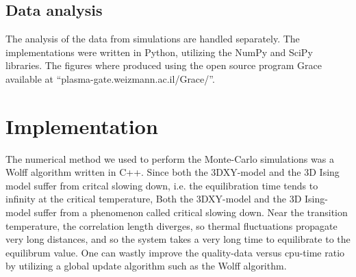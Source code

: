 \subsection{Data analysis}
The analysis of the data from simulations are handled separately. The implementations were written in Python, utilizing the NumPy and SciPy libraries. 
The figures where produced using the open source program Grace available at ``plasma-gate.weizmann.ac.il/Grace/''.

\section{Implementation}
The numerical method we used to perform the Monte-Carlo simulations was a Wolff algorithm written in C++. Since both the 3DXY-model and the 3D Ising model suffer from critcal slowing down, i.e. the equilibration time tends to infinity at the critical temperature, 
Both the 3DXY-model and the 3D Ising-model suffer from a phenomenon called critical slowing down. Near the transition temperature, the correlation length diverges, so thermal fluctuations propagate very long distances, and so the system takes a very long time to equilibrate to the equilibrum value.
One can wastly improve the quality-data versus cpu-time ratio by utilizing a global update algorithm such as the Wolff algorithm. 
